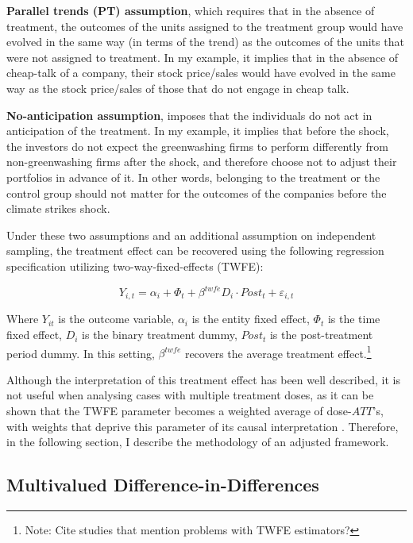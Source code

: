 \documentclass[12pt]{article}
\begin{document}
\textbf{Parallel trends (PT) assumption}, which requires that in the absence of treatment, the outcomes of the units assigned to the treatment group would have evolved in the same way (in terms of the trend) as the outcomes of the units that were not assigned to treatment. In my example, it implies that in the absence of cheap-talk of a company, their stock price/sales would have evolved in the same way as the stock price/sales of those that do not engage in cheap talk. 

\textbf{No-anticipation assumption}, imposes that the individuals do not act in anticipation of the treatment. In my example, it implies that before the shock, the investors do not expect the greenwashing firms to perform differently from non-greenwashing firms after the shock, and therefore choose not to adjust their portfolios in advance of it. In other words, belonging to the treatment or the control group should not matter for the outcomes of the companies before the climate strikes shock.

Under these two assumptions and an additional assumption on independent sampling, the treatment effect can be recovered using the following regression specification utilizing two-way-fixed-effects (TWFE):

\begin{equation}
    Y_{i,t} = \alpha_i + \Phi_t + \beta^{twfe} D_{i} \cdot Post_{t} + \varepsilon_{i,t}
\end{equation}

Where $Y_{it}$ is the outcome variable, $\alpha_i$ is the entity fixed effect, $\Phi_t$ is the time fixed effect, $D_i$ is the binary treatment dummy, $Post_t$ is the post-treatment period dummy. In this setting, $\beta^{twfe}$ recovers the average treatment effect.\footnote{Note: Cite studies that mention problems with TWFE estimators?} 

Although the interpretation of this treatment effect has been well described, it is not useful when analysing cases with multiple treatment doses, as it can be shown that the TWFE parameter becomes a weighted average of dose-$ATT$'s, with weights that deprive this parameter of its causal interpretation \parencite{callawayDifferenceindifferencesContinuousTreatment2024}. Therefore, in the following section, I describe the methodology of an adjusted framework.

\subsection{Multivalued Difference-in-Differences}
\end{document}
